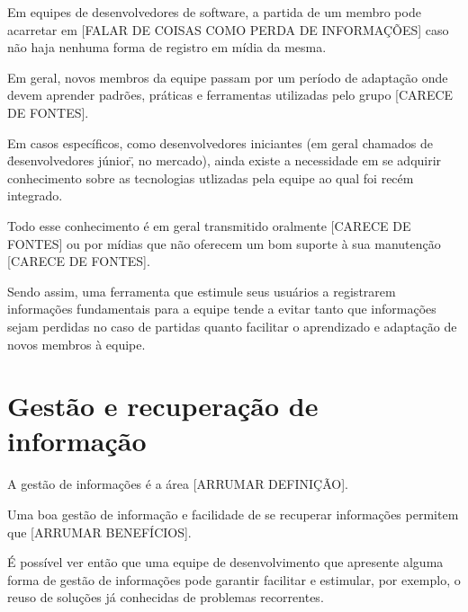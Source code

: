 Em equipes de desenvolvedores de software, a partida de um membro pode acarretar em [FALAR DE COISAS COMO PERDA DE INFORMAÇÕES] caso não haja nenhuma forma de registro em mídia da mesma.

Em geral, novos membros da equipe passam por um período de adaptação onde devem aprender padrões, práticas e ferramentas utilizadas pelo grupo [CARECE DE FONTES].

Em casos específicos, como desenvolvedores iniciantes (em geral chamados de \"desenvolvedores júnior\", no mercado), ainda existe a necessidade em se adquirir conhecimento sobre as tecnologias utlizadas pela equipe ao qual foi recém integrado.

Todo esse conhecimento é em geral transmitido oralmente [CARECE DE FONTES] ou por mídias que não oferecem um bom suporte à sua manutenção [CARECE DE FONTES].

Sendo assim, uma ferramenta que estimule seus usuários a registrarem informações fundamentais para a equipe tende a evitar tanto que informações sejam perdidas no caso de partidas quanto facilitar o aprendizado e adaptação de novos membros à equipe.

\section{Gestão e recuperação de informação}

A gestão de informações é a área [ARRUMAR DEFINIÇÃO].

Uma boa gestão de informação e facilidade de se recuperar informações permitem que [ARRUMAR BENEFÍCIOS].

É possível ver então que uma equipe de desenvolvimento que apresente alguma forma de gestão de informações pode garantir facilitar e estimular, por exemplo, o reuso de soluções já conhecidas de problemas recorrentes.


